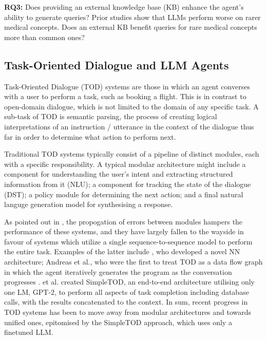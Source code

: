 \documentclass[11pt]{article}
\begin{document}
\textbf{RQ3:} Does providing an external knowledge base (KB) enhance the agent's ability to generate queries? Prior studies show that LLMs perform worse on rarer medical concepts. Does an external KB benefit queries for rare medical concepts more than common ones?

\subsection{Task-Oriented Dialogue and LLM Agents}
Task-Oriented Dialogue (TOD) systems are those in which an agent converses with a user to perform a task, such as booking a flight. This is in contrast to open-domain dialogue, which is not limited to the domain of any specific task. A sub-task of TOD is semantic parsing, the process of creating logical interpretations of an instruction / utterance in the context of the dialogue thus far in order to determine what action to perform next.

Traditional TOD systems typically consist of a pipeline of distinct modules, each with a specific responsibility. A typical modular architecture might include a component for understanding the user's intent and extracting structured information from it (NLU); a component for tracking the state of the dialogue (DST); a policy module for determining the next action; and a final natural languge generation model for synthesising a response.  

As pointed out in \citet{yi_a_survery_2024}, the propogation of errors between modules hampers the performance of these systems, and they have largely fallen to the wayside in favour of systems which utilize a single sequence-to-sequence model to perform the entire task. Examples of the latter include \citet{wen_network-based_2017}, who developed a novel NN architecture; Andreas et al., who were the first to treat TOD as a data flow graph in which the agent iteratively generates the program as the conversation progresses \citet{andreas_task-oriented_2020}. \citet{hoesseini-asl_2020} et al. created SimpleTOD, an end-to-end architecture utilising only one LM, GPT-2, to perform all aspects of task completion including database calls, with the results concatenated to the context.
In sum, recent progress in TOD systems has been to move away from modular architectures and towards unified ones, epitomised by the SimpleTOD approach, which uses only a finetuned LLM. 
\end{document}
